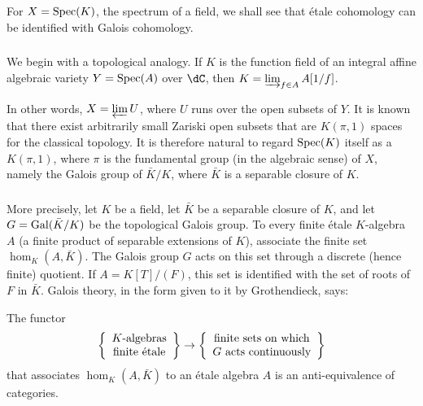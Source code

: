 For $X=\operatorname{Spec}(K)$, the spectrum of a field, we shall see that étale
cohomology can be identified with Galois cohomology.

\subsubsection{}\label{I:2-4-1}

We begin with a topological analogy. If $K$ is the function field of an
integral affine algebraic variety $Y=\operatorname{Spec}(A)$ over $\dC$, then
$K=\varinjlim_{f\in A}A[1/f]$.

In other words, $X=\varprojlim U$, where $U$ runs over the open subsets
of $Y$. It is known that there exist arbitrarily small Zariski open
subsets that are $K(\pi,1)$ spaces for the classical topology. It is
therefore natural to regard $\operatorname{Spec}(K)$ itself as a $K(\pi,1)$, where
$\pi$ is the fundamental group (in the algebraic sense) of $X$, namely
the Galois group of $\bar K/K$, where $\bar K$ is a separable closure of
$K$.

\subsubsection{}\label{I:2-4-2}

More precisely, let $K$ be a field, let $\bar K$ be a separable closure
of $K$, and let $G=\operatorname{Gal}(\bar K/K)$ be the topological Galois group. To
every finite étale $K$-algebra $A$ (a finite product of separable
extensions of $K$), associate the finite set $\hom_K(A,\bar K)$. The
Galois group $G$ acts on this set through a discrete (hence finite)
quotient. If $A=K[T]/(F)$, this set is identified with the set of roots
of $F$ in $\bar K$. Galois theory, in the form given to it by
Grothendieck, says:

\begin{proposition}\label{I:2-4-3}
The functor
\[
  \left\{\begin{array}{c}
          \textnormal{$K$-algebras} \\
          \textnormal{finite étale}
        \end{array}\right\}
  \to
  \left\{\begin{array}{c}
          \textnormal{finite sets on which} \\
          \textnormal{$G$ acts continuously}
        \end{array}\right\}
\]
that associates $\hom_K(A,\bar K)$ to an étale algebra $A$ is an
anti-equivalence of categories.
\end{proposition}

